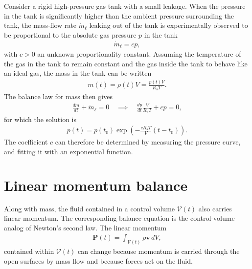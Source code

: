 \begin{example}
    Consider a rigid high-pressure gas tank with a small leakage. When the pressure in the tank is significantly higher than the ambient pressure surrounding the tank, the mass-flow rate $\dot{m}_\ell$ leaking out of the tank is experimentally observed to be proportional to the absolute gas pressure $p$ in the tank
    \begin{align*}
        \dot{m}_\ell=c p,
    \end{align*}
    with $c>0$ an unknown proportionality constant. Assuming the temperature of the gas in the tank to remain constant and the gas inside the tank to behave like an ideal gas, the mass in the tank can be written 
    \begin{align*}
        m(t)=\rho(t) V=\frac{p(t)V}{R_sT}.
    \end{align*}
    The balance law for mass then gives
    \begin{align*}
        \frac{dm}{dt}+\dot{m}_\ell=0 \quad \implies \quad \frac{dp}{dt}\frac{V}{R_sT}+cp=0,
    \end{align*}
    for which the solution is
    \begin{align*}
        p(t)=p(t_0)\exp\left(-\frac{cR_sT}{V}(t-t_0)\right).
    \end{align*}
    The coefficient $c$ can therefore be determined by measuring the pressure curve, and fitting it with an exponential function.
\end{example}

\section{Linear momentum balance}
Along with mass, the fluid contained in a control volume $\mathcal{V}(t)$ also carries linear momentum. The corresponding balance equation is the control-volume analog of Newton's second law. 
The linear momentum
\begin{align}
    \bm{P}(t)=\int_{\mathcal{V}(t)}\rho\bm{v}\,dV,
\end{align}
contained within $\mathcal{V}(t)$ can change because momentum is carried through the open surfaces by mass flow and because forces act on the fluid.

